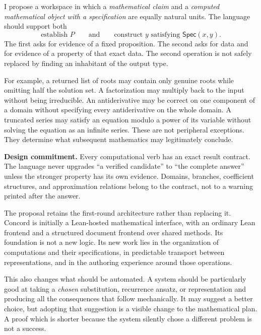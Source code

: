 \documentclass[11pt,a4paper]{article}
\newcommand{\Spec}{\mathsf{Spec}}
\theoremstyle{remark}
\begin{document}
I propose a workspace in which a \emph{mathematical claim} and a \emph{computed
mathematical object with a specification} are equally natural units. The language
should support both
\[
 \text{establish }P
 \qquad\text{and}\qquad
 \text{construct }y\text{ satisfying }\Spec(x,y).
\]
The first asks for evidence of a fixed proposition. The second asks for data and
for evidence of a property of that exact data. The second operation is not safely
replaced by finding an inhabitant of the output type.

For example, a returned list of roots may contain only genuine roots while
omitting half the solution set. A factorization may multiply back to the input
without being irreducible. An antiderivative may be correct on one component of
a domain without specifying every antiderivative on the whole domain. A
truncated series may satisfy an equation modulo a power of its variable without
solving the equation as an infinite series. These are not peripheral exceptions.
They determine what subsequent mathematics may legitimately conclude.

\begin{decisionbox}
\textbf{Design commitment.} Every computational verb has an exact result contract.
The language never upgrades ``a verified candidate'' to ``the complete answer''
unless the stronger property has its own evidence. Domains, branches, coefficient
structures, and approximation relations belong to the contract, not to a warning
printed after the answer.
\end{decisionbox}

The proposal retains the first-round architecture rather than replacing it.
Concord is initially a Lean-hosted mathematical interface, with an ordinary Lean
frontend and a structured document frontend over shared methods. Its foundation
is not a new logic. Its new work lies in the organization of computations and
their specifications, in predictable transport between representations, and in
the authoring experience around those operations.

This also changes what should be automated. A system should be particularly good
at taking a \emph{chosen} substitution, recurrence ansatz, or representation and
producing all the consequences that follow mechanically. It may suggest a better
choice, but adopting that suggestion is a visible change to the mathematical
plan. A proof which is shorter because the system silently chose a different
problem is not a success.

\end{document}
